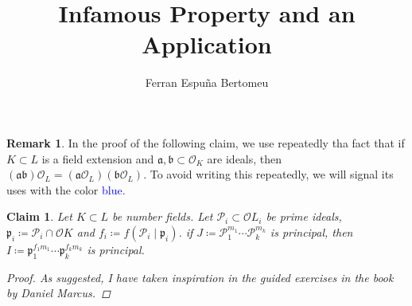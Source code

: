 \documentclass[11pt]{article}
\title{Infamous Property and an Application}
\author{Ferran Espuña Bertomeu}
\newtheorem{claim}[theorem]{Claim}
\theoremstyle{definition}
\newtheorem*{rk}{Remark}
\begin{document}
    \maketitle

    \begin{rk}
        In the proof of the following claim, we use repeatedly tha fact that
        if $K \subset L$ is a field extension and $\mathfrak{a}, \mathfrak{b} \subset \mathcal{O}_K$ are ideals,
        then $(\mathfrak{a}\mathfrak{b})\mathcal{O}_L = (\mathfrak{a}\mathcal{O}_L) (\mathfrak{b}\mathcal{O}_L)$.
        To avoid writing this repeatedly, we will signal its uses with the color \textcolor{blue}{blue}.
    \end{rk}
    
    \begin{claim} \label{claim:property}
        Let $K \subset L$ be number fields.
        Let $\mathcal{P}_i \subset \mathcal{O}L_i$ be prime ideals,
        $\mathfrak{p}_i \coloneqq \mathcal{P}_i \cap \mathcal{O}K$ and
        $f_i \coloneqq f(\mathcal{P}_i \mid \mathfrak{p}_i)$.
        if $J \coloneqq \mathcal{P}_1^{m_1} \cdots \mathcal{P}_k^{m_k}$ is principal,
        then $I \coloneqq \mathfrak{p}_1^{f_1 m_1} \cdots \mathfrak{p}_k^{f_k m_k}$ is principal.

        \begin{proof}
            As suggested, I have taken inspiration in the guided exercises in the book by Daniel Marcus.\linebreak


\end{proof}
\end{claim}
\end{document}
